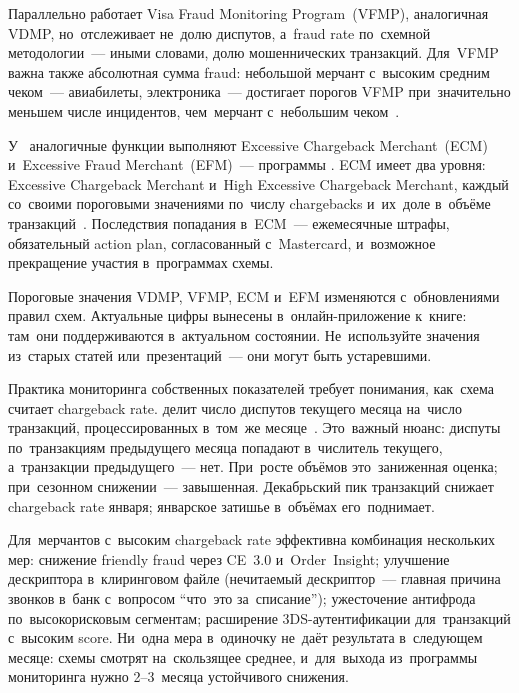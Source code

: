 Параллельно работает Visa Fraud Monitoring Program~(VFMP), аналогичная VDMP, но~отслеживает
не~долю диспутов, а~fraud rate по~схемной методологии~--- иными словами,
долю мошеннических транзакций. Для~VFMP важна также абсолютная сумма
fraud: небольшой мерчант с~высоким средним чеком~--- авиабилеты, электроника~---
достигает порогов VFMP при~значительно меньшем числе инцидентов, чем~мерчант
с~небольшим чеком~.

У~ аналогичные функции выполняют Excessive Chargeback Merchant~(ECM) и~Excessive Fraud
Merchant~(EFM)~--- программы . ECM имеет
два уровня: Excessive Chargeback Merchant и~High Excessive Chargeback Merchant,
каждый со~своими пороговыми значениями по~числу chargebacks и~их~доле
в~объёме транзакций~.
Последствия попадания в~ECM~--- ежемесячные штрафы, обязательный action
plan, согласованный с~Mastercard, и~возможное прекращение участия
в~программах схемы.

\begin{important}
  Пороговые значения VDMP, VFMP, ECM и~EFM изменяются с~обновлениями
  правил схем. Актуальные цифры вынесены в~онлайн-приложение к~книге:
  там~они поддерживаются в~актуальном состоянии. Не~используйте значения
  из~старых статей или~презентаций~--- они могут быть устаревшими.
\end{important}

Практика мониторинга собственных показателей требует понимания, как~схема
считает chargeback rate.  делит число диспутов текущего месяца
на~число транзакций, процессированных в~том~же месяце~.
Это~важный нюанс: диспуты по~транзакциям предыдущего месяца попадают
в~числитель текущего, а~транзакции предыдущего~--- нет. При~росте объёмов
это~заниженная оценка; при~сезонном снижении~--- завышенная. Декабрьский
пик транзакций снижает chargeback rate января; январское затишье в~объёмах
его~поднимает.

Для~мерчантов с~высоким chargeback rate эффективна комбинация нескольких
мер: снижение friendly fraud через CE~3.0 и~Order~Insight; улучшение
дескриптора в~клиринговом файле (нечитаемый дескриптор~--- главная причина
звонков в~банк с~вопросом \enquote{что~это за~списание}); ужесточение
антифрода по~высокорисковым сегментам; расширение 3DS-аутентификации для~транзакций
с~высоким score. Ни~одна мера в~одиночку не~даёт результата в~следующем
месяце: схемы смотрят на~скользящее среднее, и~для~выхода из~программы
мониторинга нужно 2--3~месяца устойчивого снижения.


